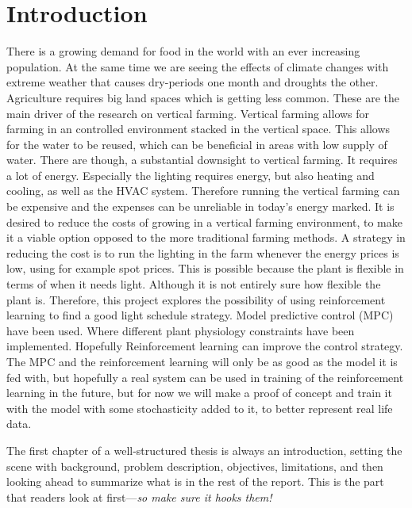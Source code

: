 \chapter{Introduction}
There is a growing demand for food in the world with an ever increasing population. At the same time we are seeing the effects of climate changes with extreme weather that causes dry-periods one month and droughts the other. Agriculture requires big land spaces  which is getting less common. These are the main driver of the research on vertical farming. Vertical farming allows for farming in an controlled environment stacked in the vertical space. This allows for the water to be reused, which can be beneficial in areas with low supply of water. There are though, a substantial downsight to vertical farming. It requires a lot of energy. Especially the lighting requires energy, but also heating and cooling, as well as the HVAC system. Therefore running the vertical farming can be expensive and the expenses can be unreliable in today's energy marked. It is desired to reduce the costs of growing in a vertical farming environment, to make it a viable option opposed to the more traditional farming methods. A strategy in reducing the cost is to run the lighting in the farm whenever the energy prices is low, using for example spot prices. This is possible because the plant is flexible in terms of when it needs light. Although it is not entirely sure how flexible the plant is. Therefore, this project explores the possibility of using reinforcement learning to find a good light schedule strategy. Model predictive control (MPC) have been used. Where different plant physiology constraints have been implemented. Hopefully Reinforcement learning can improve the control strategy. The MPC and the reinforcement learning will only be as good as the model it is fed with, but hopefully a real system can be used in training of the reinforcement learning in the future, but for now we will make a proof of concept and train it with the model with some stochasticity added to it, to better represent real life data. 


The first chapter of a well-structured thesis is always an introduction, setting the scene with background, problem description, objectives, limitations, and then looking ahead to summarize what is in the rest of the report. This is the part that readers look at first---\emph{so make sure it hooks them!}

